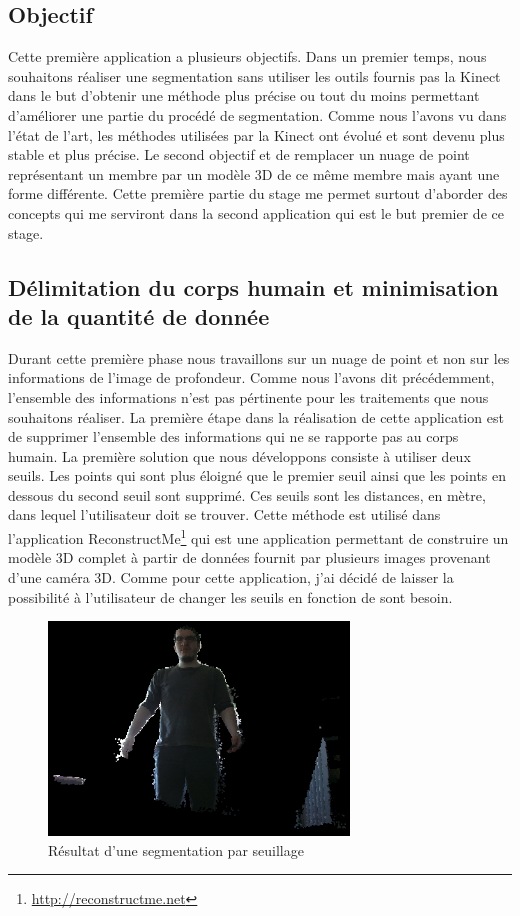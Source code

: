 \subsection{Objectif}
Cette première application a plusieurs objectifs. Dans un premier temps, nous souhaitons réaliser 
une segmentation sans utiliser les outils fournis pas la Kinect dans le but d'obtenir une méthode plus
précise ou tout du moins permettant d'améliorer une partie du procédé de segmentation. Comme nous l'avons vu dans 
l'état de l'art, les méthodes utilisées par la Kinect ont évolué et sont devenu plus stable et plus précise.
Le second objectif et de remplacer un nuage de point représentant un membre par un modèle 3D de ce même membre
mais ayant une forme différente. Cette première partie du stage me permet surtout d'aborder des concepts qui me 
serviront dans la second application qui est le but premier de ce stage.

\subsection{Délimitation du corps humain et minimisation de la quantité de donnée}
Durant cette première phase nous travaillons sur un nuage de point et non sur les informations de l'image de profondeur.
Comme nous l'avons dit précédemment, l'ensemble des informations n'est pas pértinente pour les traitements que nous souhaitons
réaliser. La première étape dans la réalisation de cette application est de supprimer l'ensemble des informations qui ne se rapporte pas 
au corps humain. La première solution que nous développons consiste à utiliser deux seuils. Les points qui sont plus éloigné que le 
premier seuil ainsi que les points en dessous du second seuil sont supprimé. 
Ces seuils sont les distances, en mètre, dans lequel l'utilisateur doit se trouver. Cette méthode est utilisé dans 
l'application ReconstructMe\footnote{\url{http://reconstructme.net}} qui est une application permettant de construire un modèle
3D complet à partir de données fournit par plusieurs images provenant d'une caméra 3D. Comme pour cette application, j'ai
décidé de laisser la possibilité à l'utilisateur de changer les seuils en fonction de sont besoin.\\

\begin{figure}[!ht]
  \begin{center}
    \includegraphics[width=8cm]{image/seuil1.PNG}
    \caption{Résultat d'une segmentation par seuillage}
    \label{fig:seuillage}
  \end{center}
\end{figure}


